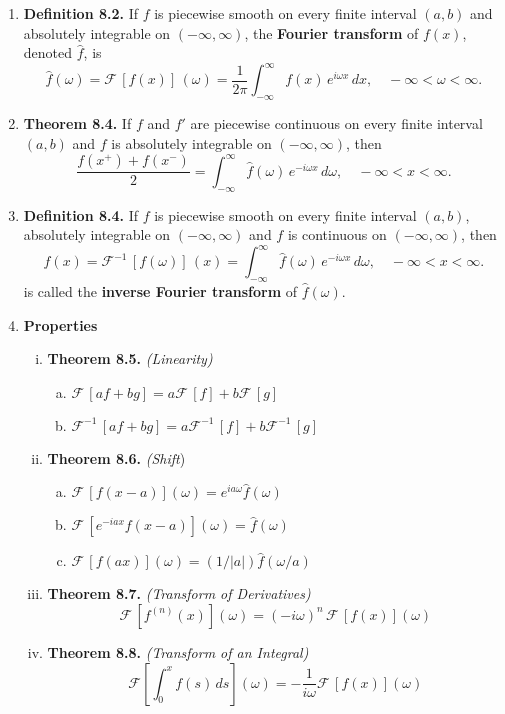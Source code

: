 \begin{enumerate}


\item \textbf{Definition 8.2.} If $f$ is piecewise smooth on every finite interval $(a, b)$ and absolutely integrable on $(-\infty, \infty)$, the \textbf{Fourier transform} of $f(x)$, denoted $\widehat{f}$, is
\[\widehat{f}(\omega) = \mathcal{F} \, [f(x)] \,(\omega) =  \frac{1}{2\pi} \int_{-\infty} ^{\infty}f(x) \,e^{i\omega x} \,dx, \quad -\infty < \omega <\infty.\]


\item \textbf{Theorem 8.4.} If $f$ and $f'$ are piecewise continuous on every finite interval $(a, b)$ and $f$ is absolutely integrable on $(-\infty, \infty)$, then
\[\frac{f(x^{+})+f(x^{-})}{2} = \int_{-\infty}^{\infty}\widehat{f}(\omega)\, e^{-i\omega x}\, d\omega, \quad -\infty <x<\infty.\]

\item \textbf{Definition 8.4.} If $f$ is piecewise smooth on every finite interval $(a, b)$, absolutely integrable on $(-\infty, \infty)$ and $f$ is continuous on $(-\infty, \infty)$, then 
\[{f}(x) = \mathcal{F}^{-1} \, [f(\omega)] \,(x) =  \int_{-\infty} ^{\infty}\widehat{f}(\omega) \,e^{-i\omega x} \,d\omega, \quad -\infty < x <\infty.\]
is called the \textbf{inverse Fourier transform} of $\widehat{f} (\omega)$.

\item \textbf{Properties}
\begin{enumerate}[(i)]
    \item \textbf{Theorem 8.5.} \textit{(Linearity) }
    \begin{enumerate}[(a)]
        \item $\mathcal{F}\,[af+bg] = a\mathcal{F}\,[f] + b \mathcal{F}\,[g]$
        \item $\mathcal{F}^{-1}\,[af+bg] = a\mathcal{F}^{-1}\,[f] + b \mathcal{F}^{-1}\,[g]$
    \end{enumerate}
    \item \textbf{Theorem 8.6.} \textit{(Shift}) 
    \begin{enumerate}[(a)]
        \item $\mathcal{F}\,[f(x-a)](\omega) = e^{ia\omega}\widehat{f}(\omega)$
        \item $\mathcal{F}\,[e^{-iax} f(x-a)](\omega) = \widehat{f}(\omega)$
        \item $\mathcal{F}\,[f(ax)](\omega) = (1/|a|)\widehat{f}(\omega/a)$
    \end{enumerate}
    \item \textbf{Theorem 8.7.} \textit{(Transform of Derivatives) }
    \[\mathcal{F}\,[f^{(n)}(x)] (\omega) = (-i\omega)^{n}\, \mathcal{F}\,[f(x)](\omega)\]
    \item \textbf{Theorem 8.8.} \textit{(Transform of an Integral)}
    \[\mathcal{F}\left[ \int_{0}^{x}f(s)\,ds \right] (\omega) = -\frac{1}{i\omega} \mathcal{F}\, [f(x)](\omega)\]
\end{enumerate}



\end{enumerate}
